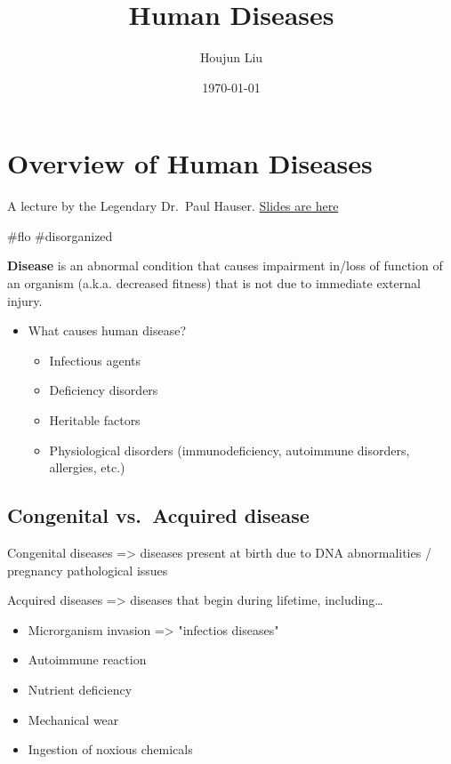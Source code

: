 \documentclass[letterpaper]{article}
\author{Houjun Liu}
\date{\today}
\title{Human Diseases}
\renewcommand\maketitle{}
\begin{document}
\maketitle


\section{Overview of Human Diseases}
\label{sec:org6175efd}
A lecture by the Legendary Dr. Paul Hauser.
\href{https://docs.google.com/presentation/d/1b2RetU6iGsd\_h4Msb2SV-\_WznNXSREbsPpfdY-LgJZs/edit\#slide=id.ga6d683dbbf\_0\_338}{Slides
are here}

\#flo \#disorganized

\textbf{Disease} is an abnormal condition that causes impairment in/loss of
function of an organism (a.k.a. decreased fitness) that is not due to
immediate external injury.

\begin{itemize}
\item What causes human disease?

\begin{itemize}
\item Infectious agents
\item Deficiency disorders
\item Heritable factors
\item Physiological disorders (immunodeficiency, autoimmune disorders,
allergies, etc.)
\end{itemize}
\end{itemize}

\subsection{Congenital vs. Acquired disease}
\label{sec:org4e26c8d}
Congenital diseases => diseases present at birth due to DNA
abnormalities / pregnancy pathological issues

Acquired diseases => diseases that begin during lifetime, including\ldots{}

\begin{itemize}
\item Microrganism invasion => "infectios diseases"
\item Autoimmune reaction
\item Nutrient deficiency
\item Mechanical wear
\item Ingestion of noxious chemicals
\end{itemize}
\end{document}
